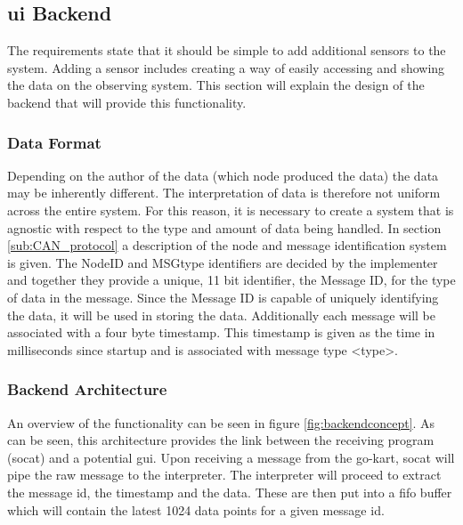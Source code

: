 \subsection{\acs{ui} Backend}
The requirements state that it should be simple to add additional sensors to the system.
Adding a sensor includes creating a way of easily accessing and showing the data on the observing system.
This section will explain the design of the backend that will provide this functionality.

\subsubsection*{Data Format}
Depending on the author of the data (which node produced the data) the data may be inherently different.
The interpretation of data is therefore not uniform across the entire system.
For this reason, it is necessary to create a system that is agnostic with respect to the type and amount of data being handled.
In section \ref{sub:CAN_protocol} a description of the node and message identification system is given.
The NodeID and MSGtype identifiers are decided by the implementer and together they provide a unique, 11 bit identifier, the Message ID, for the type of data in the message.
Since the Message ID is capable of uniquely identifying the data, it will be used in storing the data.
Additionally each message will be associated with a four byte timestamp.
This timestamp is given as the time in milliseconds since startup and is associated with message type <type>. 

\subsubsection*{Backend Architecture}
An overview of the functionality can be seen in figure \ref{fig:backendconcept}.
As can be seen, this architecture provides the link between the receiving program (socat) and a potential \acs{gui}.
Upon receiving a message from the go-kart, socat will pipe the raw message to the interpreter.
The interpreter will proceed to extract the message id, the timestamp and the data.
These are then put into a fifo buffer which will contain the latest 1024 data points for a given message id.

